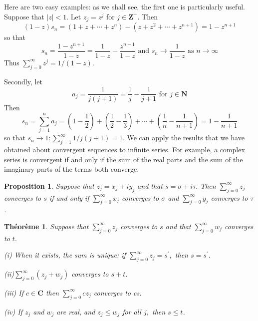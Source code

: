 \documentclass[12pt]{book}
\theoremstyle{definition}\newtheorem{dfn}{Définition}[chapter]
\theoremstyle{plain}\newtheorem{thm}{Théorème}[chapter]
\theoremstyle{plain}\newtheorem{prp}{Proposition}[chapter]
\theoremstyle{plain}\newtheorem{lem}{\bf Lemme}[chapter]
\theoremstyle{plain}\newtheorem{axm}{\bf Axiome}[chapter]
\theoremstyle{plain}\newtheorem{lmm}{\bf Lemme}[chapter]
\theoremstyle{plain}\newtheorem{exm}{\bf Example}[chapter]
\theoremstyle{plain}\newtheorem{cor}{\bf Corollaire}[chapter]
\theoremstyle{remark}\newtheorem{rem}{Remarque}[chapter]
\begin{document}
Here are two easy examples: as we shall see, the first one is particularly useful. Suppose that $|z|<1 .$ Let $z_{j}=z^{j}$ for $j \in \mathbf{Z}^{+} .$ Then
$$
(1-z) s_{n}=\left(1+z+\cdots+z^{n}\right)-\left(z+z^{2}+\cdots+z^{n+1}\right)=1-z^{n+1}
$$
so that
$$
s_{n}=\frac{1-z^{n+1}}{1-z}=\frac{1}{1-z}-\frac{z^{n+1}}{1-z} \text { and } s_{n} \rightarrow \frac{1}{1-z} \text { as } n \rightarrow \infty
$$
Thus $\sum_{j=0}^{\infty} z^{j}=1 /(1-z).$

Secondly, let
$$
a_{j}=\frac{1}{j(j+1)}=\frac{1}{j}-\frac{1}{j+1} \text { for } j \in \mathbf{N}
$$
Then
$$
s_{n}=\sum_{j=1}^{n} a_{j}=\left(1-\frac{1}{2}\right)+\left(\frac{1}{2}-\frac{1}{3}\right)+\cdots+\left(\frac{1}{n}-\frac{1}{n+1}\right)=1-\frac{1}{n+1}
$$
so that $s_{n} \rightarrow 1: \sum_{j=1}^{\infty} 1 / j(j+1)=1$.
We can apply the results that we have obtained about convergent sequences to infinite series. For example, a complex series is convergent if and only if the sum of the real parts and the sum of the imaginary parts of the terms both converge.
\begin{prp}
Suppose that $z_{j}=x_{j}+i y_{j}$ and that $s=\sigma+i \tau .$ Then $\sum_{j=0}^{\infty} z_{j}$ converges to $s$ if and only if $\sum_{j=0}^{\infty} x_{j}$ converges to $\sigma$ and $\sum_{j=0}^{\infty} y_{j}$ converges to $\tau$.
\end{prp}
\begin{thm}
	Suppose that $\sum_{j=0}^{\infty} z_{j}$ converges to $s$ and that $\sum_{j=0}^{\infty} w_{j}$ converges to $t .$
	
	(i) When it exists, the sum is unique: if $\sum_{j=0}^{\infty} z_{j}=s^{\prime},$ then $s=s^{\prime}$.
	
	(ii)$\sum_{j=0}^{\infty}\left(z_{j}+w_{j}\right)$ converges to $s+t$.
	
	(iii) If $c \in \mathbf{C}$ then $\sum_{j=0}^{\infty} c z_{j}$ converges to cs.
	
	(iv) If $z_{j}$ and $w_{j}$ are real, and $z_{j} \leq w_{j}$ for all $j,$ then $s \leq t$.
\end{thm}
\end{document}
